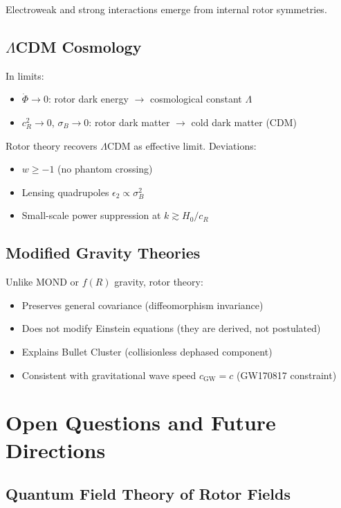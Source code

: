 \documentclass[11pt,a4paper]{article}
\numberwithin{equation}{section}
\theoremstyle{plain}
\theoremstyle{definition}
\theoremstyle{remark}
\begin{document}
Electroweak and strong interactions emerge from internal rotor symmetries.

\subsection{$\Lambda$CDM Cosmology}

In limits:
\begin{itemize}
\item $\dot{\Phi} \to 0$: rotor dark energy $\to$ cosmological constant $\Lambda$
\item $c_R^2 \to 0$, $\sigma_B \to 0$: rotor dark matter $\to$ cold dark matter (CDM)
\end{itemize}

Rotor theory recovers $\Lambda$CDM as effective limit. Deviations:
\begin{itemize}
\item $w \geq -1$ (no phantom crossing)
\item Lensing quadrupoles $\epsilon_2 \propto \sigma_B^2$
\item Small-scale power suppression at $k \gtrsim H_0/c_R$
\end{itemize}

\subsection{Modified Gravity Theories}

Unlike MOND or $f(R)$ gravity, rotor theory:
\begin{itemize}
\item Preserves general covariance (diffeomorphism invariance)
\item Does not modify Einstein equations (they are derived, not postulated)
\item Explains Bullet Cluster (collisionless dephased component)
\item Consistent with gravitational wave speed $c_{\mathrm{GW}} = c$ (GW170817 constraint)
\end{itemize}

\section{Open Questions and Future Directions}
\label{sec:future}

\subsection{Quantum Field Theory of Rotor Fields}
\end{document}

